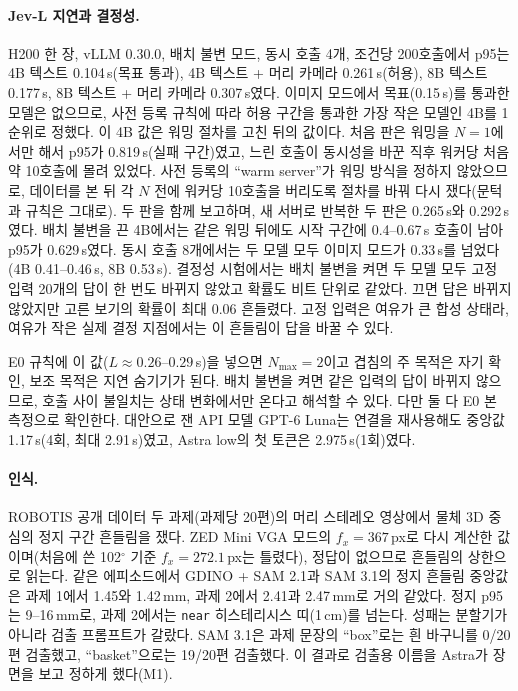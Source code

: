 \paragraph{Jev-L 지연과 결정성.}
H200 한 장, vLLM 0.30.0, 배치 불변 모드, 동시 호출 4개, 조건당 200호출에서 p95는 4B 텍스트 0.104\,s(목표 통과), 4B 텍스트 + 머리 카메라 0.261\,s(허용), 8B 텍스트 0.177\,s, 8B 텍스트 + 머리 카메라 0.307\,s였다. 이미지 모드에서 목표(0.15\,s)를 통과한 모델은 없으므로, 사전 등록 규칙에 따라 허용 구간을 통과한 가장 작은 모델인 4B를 1순위로 정했다. 이 4B 값은 워밍 절차를 고친 뒤의 값이다. 처음 판은 워밍을 $N=1$에서만 해서 p95가 0.819\,s(실패 구간)였고, 느린 호출이 동시성을 바꾼 직후 워커당 처음 약 10호출에 몰려 있었다. 사전 등록의 ``warm server''가 워밍 방식을 정하지 않았으므로, 데이터를 본 뒤 각 $N$ 전에 워커당 10호출을 버리도록 절차를 바꿔 다시 쟀다(문턱과 규칙은 그대로). 두 판을 함께 보고하며, 새 서버로 반복한 두 판은 0.265\,s와 0.292\,s였다. 배치 불변을 끈 4B에서는 같은 워밍 뒤에도 시작 구간에 0.4--0.67\,s 호출이 남아 p95가 0.629\,s였다. 동시 호출 8개에서는 두 모델 모두 이미지 모드가 0.33\,s를 넘었다(4B 0.41--0.46\,s, 8B 0.53\,s). 결정성 시험에서는 배치 불변을 켜면 두 모델 모두 고정 입력 20개의 답이 한 번도 바뀌지 않았고 확률도 비트 단위로 같았다. 끄면 답은 바뀌지 않았지만 고른 보기의 확률이 최대 0.06 흔들렸다. 고정 입력은 여유가 큰 합성 상태라, 여유가 작은 실제 결정 지점에서는 이 흔들림이 답을 바꿀 수 있다.

E0 규칙에 이 값($L\approx0.26$--$0.29$\,s)을 넣으면 $N_{\max}=2$이고 겹침의 주 목적은 자기 확인, 보조 목적은 지연 숨기기가 된다. 배치 불변을 켜면 같은 입력의 답이 바뀌지 않으므로, 호출 사이 불일치는 상태 변화에서만 온다고 해석할 수 있다. 다만 둘 다 E0 본 측정으로 확인한다. 대안으로 잰 API 모델 GPT-6 Luna는 연결을 재사용해도 중앙값 1.17\,s(4회, 최대 2.91\,s)였고, Astra low의 첫 토큰은 2.975\,s(1회)였다.

\paragraph{인식.}
ROBOTIS 공개 데이터 두 과제(과제당 20편)의 머리 스테레오 영상에서 물체 3D 중심의 정지 구간 흔들림을 쟀다. ZED Mini VGA 모드의 $f_x=367$\,px로 다시 계산한 값이며(처음에 쓴 102$^\circ$ 기준 $f_x=272.1$\,px는 틀렸다), 정답이 없으므로 흔들림의 상한으로 읽는다. 같은 에피소드에서 GDINO + SAM 2.1과 SAM 3.1의 정지 흔들림 중앙값은 과제 1에서 1.45와 1.42\,mm, 과제 2에서 2.41과 2.47\,mm로 거의 같았다. 정지 p95는 9--16\,mm로, 과제 2에서는 \texttt{near} 히스테리시스 띠(1\,cm)를 넘는다. 성패는 분할기가 아니라 검출 프롬프트가 갈랐다. SAM 3.1은 과제 문장의 ``box''로는 흰 바구니를 0/20편 검출했고, ``basket''으로는 19/20편 검출했다. 이 결과로 검출용 이름을 Astra가 장면을 보고 정하게 했다(M1).

